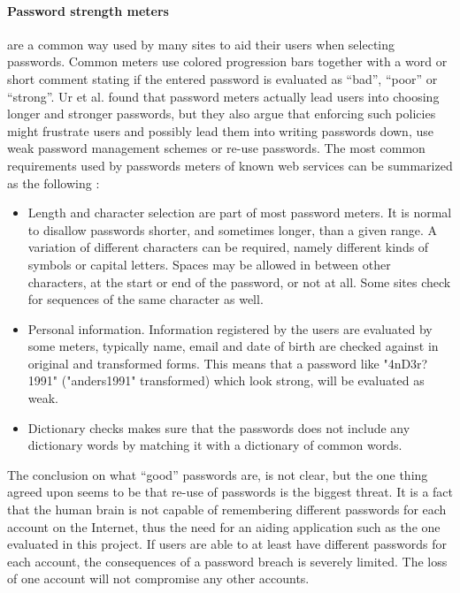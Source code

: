 \paragraph{Password strength meters} are a common way used by many sites to aid their users when selecting passwords. Common meters use colored progression bars together with a word or short comment stating if the entered password is evaluated as ``bad'', ``poor'' or ``strong''. Ur et al. \cite{password-meters2} found that password meters actually lead users into choosing longer and stronger passwords, but they also argue that enforcing such policies might frustrate users and possibly lead them into writing passwords down, use weak password management schemes or re-use passwords. The most common requirements used by passwords meters of known web services can be summarized as the following \cite{password-meters}:
\begin{itemize}
    \item{Length and character selection} are part of most password meters. It is normal to disallow passwords shorter, and sometimes longer, than a given range. A variation of different characters can be required, namely different kinds of symbols or capital letters. Spaces may be allowed in between other characters, at the start or end of the password, or not at all. Some sites check for sequences of the same character as well.
    \item{Personal information.} Information registered by the users are evaluated by some meters, typically name, email and date of birth are checked against in original and transformed forms. This means that a password like "4nD3r?1991" ("anders1991" transformed) which look strong, will be evaluated as weak.
    \item{Dictionary checks} makes sure that the passwords does not include any dictionary words by matching it with a dictionary of common words. 
\end{itemize}


%

\par The conclusion on what ``good'' passwords are, is not clear, but the one thing agreed upon seems to be that re-use of passwords is the biggest threat. It is a fact that the human brain is not capable of remembering different passwords for each account on the Internet, thus the need for an aiding application such as the one evaluated in this project. If users are able to at least have different passwords for each account, the consequences of a password breach is severely limited. The loss of one account will not compromise any other accounts. 

